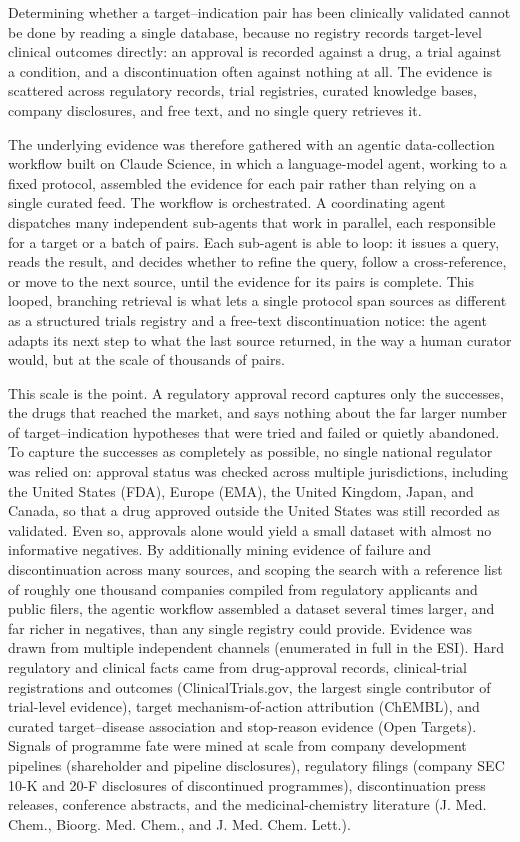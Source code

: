 \documentclass[11pt,twocolumn]{article}
\begin{document}
Determining whether a target--indication pair has been clinically validated cannot be done by reading a single database, because no registry records target-level clinical outcomes directly: an approval is recorded against a drug, a trial against a condition, and a discontinuation often against nothing at all. The evidence is scattered across regulatory records, trial registries, curated knowledge bases, company disclosures, and free text, and no single query retrieves it.

The underlying evidence was therefore gathered with an agentic data-collection workflow built on Claude Science, in which a language-model agent, working to a fixed protocol, assembled the evidence for each pair rather than relying on a single curated feed. The workflow is orchestrated. A coordinating agent dispatches many independent sub-agents that work in parallel, each responsible for a target or a batch of pairs. Each sub-agent is able to loop: it issues a query, reads the result, and decides whether to refine the query, follow a cross-reference, or move to the next source, until the evidence for its pairs is complete. This looped, branching retrieval is what lets a single protocol span sources as different as a structured trials registry and a free-text discontinuation notice: the agent adapts its next step to what the last source returned, in the way a human curator would, but at the scale of thousands of pairs.

This scale is the point. A regulatory approval record captures only the successes, the drugs that reached the market, and says nothing about the far larger number of target--indication hypotheses that were tried and failed or quietly abandoned. To capture the successes as completely as possible, no single national regulator was relied on: approval status was checked across multiple jurisdictions, including the United States (FDA), Europe (EMA), the United Kingdom, Japan, and Canada, so that a drug approved outside the United States was still recorded as validated. Even so, approvals alone would yield a small dataset with almost no informative negatives. By additionally mining evidence of failure and discontinuation across many sources, and scoping the search with a reference list of roughly one thousand companies compiled from regulatory applicants and public filers, the agentic workflow assembled a dataset several times larger, and far richer in negatives, than any single registry could provide. Evidence was drawn from multiple independent channels (enumerated in full in the ESI). Hard regulatory and clinical facts came from drug-approval records, clinical-trial registrations and outcomes (ClinicalTrials.gov,\cite{ref40} the largest single contributor of trial-level evidence), target mechanism-of-action attribution (ChEMBL\cite{ref41}), and curated target--disease association and stop-reason evidence (Open Targets\cite{ref42}). Signals of programme fate were mined at scale from company development pipelines (shareholder and pipeline disclosures), regulatory filings (company SEC 10-K and 20-F disclosures of discontinued programmes), discontinuation press releases, conference abstracts, and the medicinal-chemistry literature (J. Med. Chem., Bioorg. Med. Chem., and J. Med. Chem. Lett.).
\end{document}
